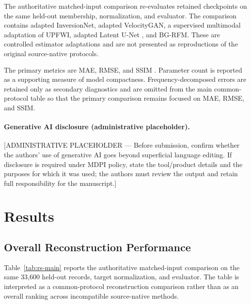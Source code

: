 \documentclass[remotesensing,article,submit,pdftex,moreauthors]{Definitions/mdpi}
\newcommand{\method}{BG-RFM}
\begin{document}
The authoritative matched-input comparison re-evaluates retained checkpoints on the same held-out membership, normalization, and evaluator. The comparison contains adapted InversionNet, adapted VelocityGAN, a supervised multimodal adaptation of UPFWI, adapted Latent U-Net \citep{gupta2025gfi}, and \method. These are controlled estimator adaptations and are not presented as reproductions of the original source-native protocols.

The primary metrics are MAE, RMSE, and SSIM \citep{wang2004ssim}. Parameter count is reported as a supporting measure of model compactness. Frequency-decomposed errors are retained only as secondary diagnostics and are omitted from the main common-protocol table so that the primary comparison remains focused on MAE, RMSE, and SSIM.


\ifdefined\BLINDREVIEW\else
\paragraph{Generative AI disclosure (administrative placeholder).}
[ADMINISTRATIVE PLACEHOLDER --- Before submission, confirm whether the authors' use of generative AI goes beyond superficial language editing. If disclosure is required under MDPI policy, state the tool/product details and the purposes for which it was used; the authors must review the output and retain full responsibility for the manuscript.]
\fi

\section{Results}

\subsection{Overall Reconstruction Performance}

Table~\ref{tab:rs-main} reports the authoritative matched-input comparison on the same 33,600 held-out records, target normalization, and evaluator. The table is interpreted as a common-protocol reconstruction comparison rather than as an overall ranking across incompatible source-native methods.
\end{document}
